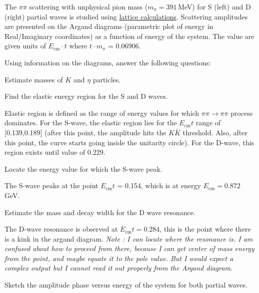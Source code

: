 
The $\pi\pi$ scattering with
unphysical pion mass ($m_\pi=391\,$MeV) for S (left) and D (right) partial waves
is studied using \href{https://inspirehep.net/literature/1618009}{lattice calculations}.
Scattering amplitudes are presented on the Argand diagrams
(parametric plot of energy in Real/Imaginary coordinates) as a function of energy of the system.
The value are given units of $E_\text{cm} \cdot t$ where $t \cdot m_\pi$ = 0.06906.


Using information on the diagrams, answer the following questions:
\be
\item Estimate masses of $K$ and $\eta$ particles.\\
\item Find the elastic energy region for the S and D waves.\\
\begin{solution}
	Elastic region is defined as the range of energy values for which $\pi\pi \rightarrow \pi\pi$ process dominates. For the S-wave, the elastic region lies for the $E_\text{cm}t$ range of [0.139,0.189] (after this point, the amplitude hits the $K\bar{K}$ threshold. Also, after this point, the curve starts going inside the unitarity circle). For the D-wave, this region exists until value of 0.229.
\end{solution}
\item Locate the energy value for which the S-wave peak. \\
\begin{solution}
	The S-wave peaks at the point $E_\text{cm}t$ = 0.154, which is at energy $E_\text{cm} = 0.872$ GeV.
\end{solution}
\item Estimate the mass and decay width for the D wave resonance.\\
\begin{solution}
	The D-wave resonance is observed at $E_\text{cm}t = 0.284$, this is the point where there is a kink in the argand diagram. \textit{Note : I can locate where the resonance is. I am confused about how to proceed from there, because I can get center of mass energy from the point, and maybe equate it to the pole value. But I would expect a complex output but I cannot read it out properly from the Argand diagram}.
\end{solution}
\item Sketch the amplitude phase versus energy of the system for both partial waves.\\
\ee